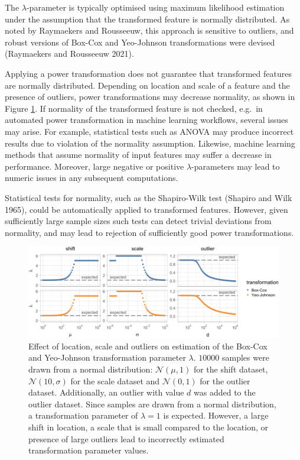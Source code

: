 \documentclass[
  a4paper,
]{article}
\begin{document}
The \(\lambda\)-parameter is typically optimised using maximum
likelihood estimation under the assumption that the transformed feature
is normally distributed. As noted by Raymaekers and Rousseeuw, this
approach is sensitive to outliers, and robust versions of Box-Cox and
Yeo-Johnson transformations were devised (Raymaekers and Rousseeuw
2021).

Applying a power transformation does not guarantee that transformed
features are normally distributed. Depending on location and scale of a
feature and the presence of outliers, power transformations may decrease
normality, as shown in Figure \ref{fig:decreased-normality}. If
normality of the transformed feature is not checked, e.g.~in automated
power transformation in machine learning workflows, several issues may
arise. For example, statistical tests such as ANOVA may produce
incorrect results due to violation of the normality assumption.
Likewise, machine learning methods that assume normality of input
features may suffer a decrease in performance. Moreover, large negative
or positive \(\lambda\)-parameters may lead to numeric issues in any
subsequent computations.

Statistical tests for normality, such as the Shapiro-Wilk test (Shapiro
and Wilk 1965), could be automatically applied to transformed features.
However, given sufficiently large sample sizes such tests can detect
trivial deviations from normality, and may lead to rejection of
sufficiently good power transformations.

\begin{figure}

{\centering \includegraphics{manuscript_files/figure-latex/decreased-normality-1} 

}

\caption{Effect of location, scale and outliers on estimation of the Box-Cox and Yeo-Johnson transformation parameter $\lambda$. $10000$ samples were drawn from a normal distribution: $\mathcal{N}(\mu, 1)$ for the shift dataset, $\mathcal{N}(10, \sigma)$ for the scale dataset and $\mathcal{N}(0, 1)$ for the outlier dataset. Additionally, an outlier with value $d$ was added to the outlier dataset. Since samples are drawn from a normal distribution, a transformation parameter of $\lambda = 1$ is expected. However, a large shift in location, a scale that is small compared to the location, or presence of large outliers lead to incorrectly estimated transformation parameter values.}\label{fig:decreased-normality}
\end{figure}
\end{document}
